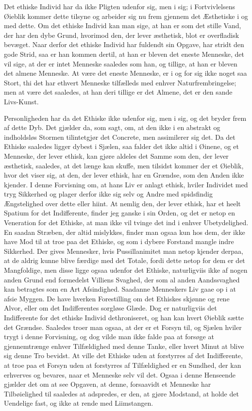 \documentclass[12pt,a4paper]{article}
\begin{document}
Det ethiske Individ har da ikke Pligten udenfor sig, men i sig; i Fortvivlelsens Øieblik kommer dette tilsyne og arbeider sig nu frem gjennem det Æsthetiske i og med dette. Om det ethiske Individ kan man sige, at han er som det stille Vand, der har den dybe Grund, hvorimod den, der lever æsthetisk, blot er overfladisk bevæget. Naar derfor det ethiske Individ har fuldendt sin Opgave, har stridt den gode Strid, saa er han kommen dertil, at han er bleven det eneste Menneske, det vil sige, at der er intet Menneske saaledes som han, og tillige, at han er bleven det almene Menneske. At være det eneste Menneske, er i og for sig ikke noget saa Stort, thi det har ethvert Menneske tilfælleds med enhver Naturfrembringelse; men at være det saaledes, at han deri tillige er det Almene, det er den sande Livs-Kunst.

Personligheden har da det Ethiske ikke udenfor sig, men i sig, og det bryder frem af dette Dyb. Det gjælder da, som sagt, om, at den ikke i en abstrakt og indholdsløs Stormen tilintetgjør det Concrete, men assimilerer sig det. Da det Ethiske saaledes ligger dybest i Sjælen, saa falder det ikke altid i Øinene, og et Menneske, der lever ethisk, kan gjøre aldeles det Samme som den, der lever æsthetisk, saaledes, at det længe kan skuffe, men tilsidst kommer der et Øieblik, hvor det viser sig, at den, der lever ethisk, har en Grændse, som den Anden ikke kjender. I denne Forvisning om, at hans Liv er anlagt ethisk, hviler Individet med tryg Sikkerhed og plager derfor ikke sig selv og Andre med spidsfindig Ængstelighed over dette eller hiint. At nemlig den, der lever ethisk, har et heelt Spatium for det Indifferente, finder jeg ganske i sin Orden, og det er netop en Veneration for det Ethiske, at man ikke vil tvinge det ind i enhver Ubetydelighed. En saadan Stræben, der altid mislykkes, finder man ogsaa kun hos dem, der ikke have Mod til at troe paa det Ethiske, og som i dybere Forstand mangle indre Sikkerhed. Der gives Mennesker, hvis Pussillanimitet man netop kjender derpaa, at de aldrig kunne blive færdige med det Totale, fordi dette netop for dem er det Mangfoldige, men disse ligge ogsaa udenfor det Ethiske, naturligviis ikke af nogen anden Grund end formedelst Villiens Svaghed, der som al anden Aandssvaghed kan betragtes som en Art Afsindighed. Saadanne Menneskers Liv gaae op i at afsie Myggen. De have hverken Forestilling om det Ethiskes skjønne og rene Alvor, eller om det Indifferentes sorgløse Glæde. Dog er naturligviis det Indifferente for det ethiske Individ dethroniseret, og han kan hvert Øieblik sætte det Grændse. Saaledes troer man ogsaa, at der er et Forsyn til, og Sjælen hviler trygt i denne Forvisning, og dog vilde man ikke falde paa at forsøge at gjennemtrænge enhver Tilfældighed med denne Tanke, eller hvert Minut at blive sig denne Tro bevidst. At ville det Ethiske uden at forstyrres af det Indifferente, at troe paa et Forsyn uden at forstyrres af Tilfældighed er en Sundhed, der kan erhverves og bevares, naar et Menneske selv vil det. Ogsaa i denne Henseende gjælder det om at see Opgaven, at denne, forsaavidt et Menneske har Tilbøielighed til saaledes at adspredes, er den, at gjøre Modstand, at holde det Uendelige fast, og ikke at rende med Liimstangen.
\end{document}
